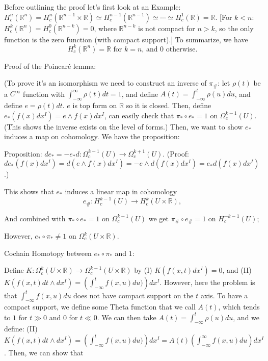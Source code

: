 \documentclass{article}
\theoremstyle{mystyle}
\theoremstyle{remark}
\numberwithin{equation}{section}
\begin{document}
Before outlining the proof let's first look at an Example: $H^n_c(\mathbb{R}^n) = H^n_c(\mathbb{R}^{n-1}\times \mathbb{R}) \simeq H^{n-1}_c(\mathbb{R}^{n-1})
\simeq \cdots \simeq H^1_c(\mathbb{R}) = \mathbb{R}$. [For $k<n$: $H^k_c(\mathbb{R}^n)=H^0_c(\mathbb{R}^{n-k})=0$, where $\mathbb{R}^{n-k}$ is not compact for $n>k$, so the only function is the zero function (with compact support).] To summarize, we have 
\begin{equation}\label{Rnc}
H^k_c(\mathbb{R}^n) = \mathbb{R} \text{ for }k=n\text{, and }0\text{ otherwise.}
\end{equation}

Proof of the Poincar\'e lemma:

(To prove it's an isomorphism we need to construct an inverse of $\pi_\#$: let $\rho(t)$ be a $C^\infty$ function with $\int^\infty_{-\infty}\rho(t)dt=1$, and define $A(t) = \int^t_{-\infty}\rho(u)du$, and define $e = \rho(t)dt$. $e$ is top form on $\mathbb{R}$ so it is closed. Then, define $e_*(f(x)dx^I) = e\wedge f(x)d x^I$, can easily check that $\pi_*\circ e_* = 1$ on $\Omega^{k-1}_c(U)$. (This shows the inverse exists on the level of forms.) Then, we want to show $e_*$ induces a map on cohomology. We have the proposition:

Proposition: $de_* = -e_*d\colon \Omega^{k-1}_c(U)\rightarrow \Omega_c^{k+1}(U)$. (Proof: $de_*(f(x)dx^I)
=d(e\wedge f(x)d x^I) = -e\wedge d(f(x)d x^I) = e_*d(f(x)d x^I)$.)

This shows that $e_*$ induces a linear map in cohomology
$$e_\#\colon H^{k-1}_c(U) \rightarrow H^k_c(U\times \mathbb{R}),$$

And combined with $\pi_*\circ e_* = 1$ on $\Omega^{k-1}_c(U)$ we get $\pi_\#\circ e_\# = 1$ on $H^{-k-1}_c(U)$; 

However, $e_*\circ \pi_*\neq 1$ on $\Omega^k_c(U\times \mathbb{R})$.


Cochain Homotopy between $e_*\circ \pi_*$ and $1$:

Define $K\colon \Omega^k_c(U\times \mathbb{R})\rightarrow \Omega^{k-1}_c(U\times \mathbb{R})$ by (I) $K(f(x,t)dx^I)=0$, and (II) $K(f(x,t)dt\wedge dx^I) = \left(\int^t_{-\infty} f(x,u)du)\right)dx^I$. However, here the problem is that $\int^t_{-\infty} f(x,u)du$ does not have compact support on the $t$ axis. To have a compact support, we define some Theta function that we call $A(t)$, which tends to $1$ for $t\gg 0$ and $0$ for $t\ll 0$. We can then take $A(t) = \int_{-\infty}^t \rho(u)du$, and we define: (II)
$K(f(x,t)dt\wedge dx^I) = \left(\int^t_{-\infty} f(x,u)du)\right)dx^I = A(t)\left(\int^\infty_{-\infty} f(x,u)du\right)dx^I$. Then, we can show that
\end{document}
